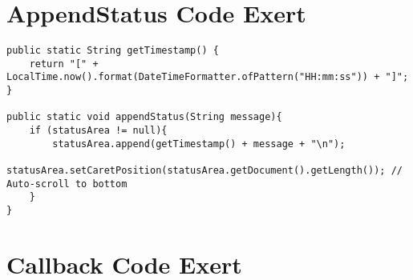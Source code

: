 \chapter{AppendStatus Code Exert}\label{app:appendStatus}
\begin{lstlisting}
public static String getTimestamp() {
    return "[" + LocalTime.now().format(DateTimeFormatter.ofPattern("HH:mm:ss")) + "]";
}

public static void appendStatus(String message){
    if (statusArea != null){
        statusArea.append(getTimestamp() + message + "\n");
        statusArea.setCaretPosition(statusArea.getDocument().getLength()); // Auto-scroll to bottom
    }
}
\end{lstlisting}
\chapter{Callback Code Exert}\label{app:callback_code}

